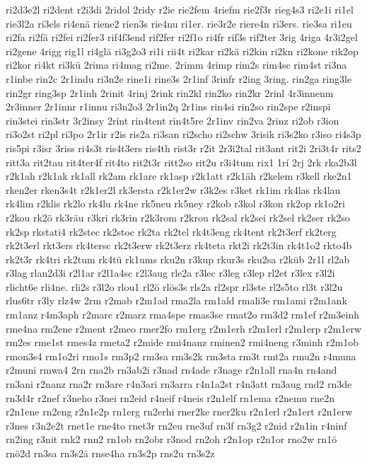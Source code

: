 {ri2d3e2l
ri2dent
r2i3di
2ridol
2ridy
r2ie
rie2fem
4riefm
rie2f3r
rieg4s3
ri2e1i
ri1el
rie3l2a
ri3els
ri4enä
riene2
rien3s
rie4nu
ri1er.
rie3r2e
riere4n
ri3ers.
rie3sa
ri1eu
ri2fa
ri2fä
ri2fei
ri2fer3
rif4f3end
rif2fer
ri2f1o
ri4fr
rif3s
rif2ter
3rig
4riga
4r3i2gel
ri2gene
4rigg
rig1l
ri4glä
ri3g2o3
ri1i
rii4t
ri2kar
ri2kä
ri2kin
ri2kn
ri2kone
rik2op
ri2kor
ri4kt
ri3kü
2rima
ri4mag
ri2me.
2rimm
4rimp
rim2s
rim4sc
rim4st
ri3na
r1inbe
rin2c
2r1indu
ri3n2e
rine1i
rine3s
2r1inf
3rinfr
r2ing
3ring.
rin2ga
ring3le
rin2gr
ring3sp
2r1inh
2rinit
4rinj
2rink
rin2kl
rin2ko
rin2kr
2rinl
4r3innenm
2r3inner
2r1innr
r1innu
ri3n2o3
2r1in2q
2r1ins
rin4si
rin2so
rin2spe
r2inspi
rin3stei
rin3str
3r2insy
2rint
rin4tent
rin4t5re
2r1inv
rin2va
2rinz
ri2ob
r3ion
ri3o2st
ri2pl
ri3po
2r1ir
r2is
ris2a
ri3san
ri2scho
ri2schw
3risik
ri3s2ko
r3iso
ri4s3p
ris5pi
r3isr
3riss
ri4s3t
ris4t3ers
ris4th
rist3r
r2it
2r3i2tal
rit3ant
rit2i
2ri3t4r
rits2
ritt3a
rit2tau
rit4ter4f
rit4to
rit2t3r
ritt2so
rit2u
r3i4tum
rix1
1rí
2rj
2rk
rka2b3l
r2k1ah
r2k1ak
rk1all
rk2am
rk1are
rk1asp
r2k1att
r2k1äh
r2kelem
r3kell
rke2n1
rken2er
rken3s4t
r2k1er2l
rk3ersta
r2k1er2w
r3k2es
r3ket
rk1im
rk4las
rk4lau
rk4lim
r2klis
rk2lo
rk4lu
rk4ne
rk5neu
rk5ney
r2kob
r3kol
r3kon
rk2op
rk1o2ri
r2kou
rk2ö
rk3räu
r3kri
rk3rin
r2k3rom
r2krou
rk2sal
rk2sei
rk2sel
rk2ser
rk2so
rk2sp
rkstati4
rk2stec
rk2stoc
rk2ta
rk2tel
rk4t3eng
rk4tent
rk2t3erf
rk2terg
rk2t3erl
rkt3ers
rk4tersc
rk2t3erw
rk2t3erz
rk4teta
rkt2i
rk2t3in
rk4t1o2
rkto4b
rk2t3r
rk4tri
rk2tum
rk4tü
rk1ums
rku2n
r3kup
rkur3s
rku2sa
r2küb
2r1l
rl2ab
r3lag
rlan2d3i
r2l1ar
r2l1a4sc
r2l3aug
rle2a
r3lec
r3leg
r3lep
rl2et
r3lex
r3l2i
rlicht6e
rli4ne.
rli2s
r3l2o
rlou1
rl2ö
rlös3s
rls2a
rl2spr
rl3ste
rl2s5to
rl3t
r3l2u
rlus6tr
r3ly
rlz4w
2rm
r2mab
r2m1ad
rma2la
rm1ald
rmali3e
rm1ami
r2m1ank
rm1anz
r4m3aph
r2marc
r2marz
rma4spe
rmas3se
rmat2o
rm3d2
rm1ef
r2m3einh
rme4na
rm2ene
r2ment
r2meo
rmer2fo
rm1erg
r2m1erh
r2m1erl
r2m1erp
r2m1erw
rm2es
rme1st
rmes4z
rmeta2
r2mide
rmi4nanz
rminen2
rmi4neng
r3minh
r2m1ob
rmon3s4
rm1o2ri
rmo1s
rm3p2
rm3sa
rm3s2k
rm3sta
rm3t
rmt2a
rmu2n
r4muna
r2muni
rmwa4
2rn
rna2b
rn3ab2i
r3nad
rn4ade
r3nage
r2n1all
rna4n
rn4and
rn3ani
r2nanz
rna2r
rn3are
r4n3ari
rn3arra
r4n1a2st
r4n3att
rn3aug
rnd2
rn3de
rn3d4r
r2nef
r3neho
r3nei
rn2eid
r4neif
r4neis
r2n1elf
rn1ema
r2nemu
rne2n
r2n1ene
rn2eng
r2n1e2p
rn1erg
rn2erhi
rner2ke
rner2ku
r2n1erl
r2n1ert
r2n1erw
r3nes
r3n2e2t
rnet1e
rne4to
rnet3r
rn2eu
rne3uf
rn3f
rn3g2
r2nid
r2n1in
r4ninf
rn2ing
r3nit
rnk2
rnn2
rn1ob
rn2obr
r3nod
rn2oh
r2n1op
r2n1or
rno2w
rn1ö
rnö2d
rn3sa
rn3s2ä
rnse4ha
rn3s2p
rns2u
rn3s2z
}
